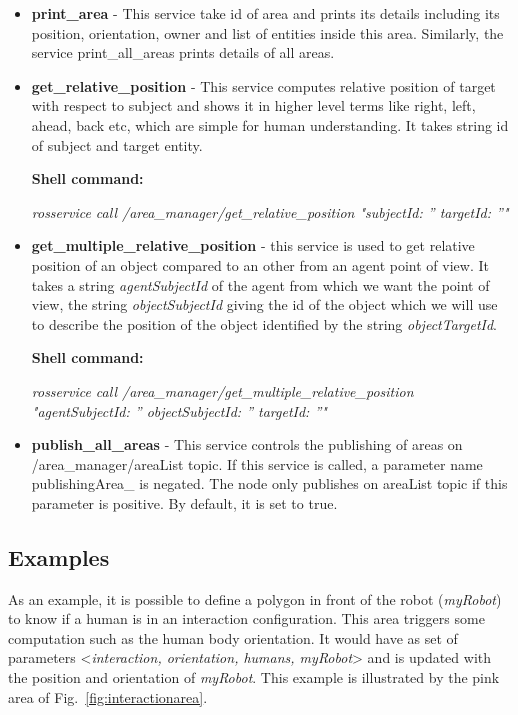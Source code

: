\documentclass[a4paper]{article}
\begin{document}
\begin{itemize}
\item \textbf{print\_area} - This service take id of area and prints its details including its position, orientation, owner and list of entities inside this area. Similarly, the service print\_all\_areas prints details of all areas.

\item \textbf{get\_relative\_position} - This service computes relative position of target with respect to subject and shows it in higher level terms like right, left, ahead, back etc, which are simple for human understanding. It takes string id of subject and target entity.

\textbf{Shell command:}

\textit{rosservice call /area\_manager/get\_relative\_position "subjectId: ''
targetId: ''" }

\item \textbf{get\_multiple\_relative\_position} - this service is used to get relative position of an object compared to an other from an agent point of view. It takes a string \textit{agentSubjectId} of the agent from which we want the point of view, the string \textit{objectSubjectId} giving the id of the object which we will use to describe the position of the object identified by the string \textit{objectTargetId}.

\textbf{Shell command:}

\textit{rosservice call /area\_manager/get\_multiple\_relative\_position "agentSubjectId: ''
objectSubjectId: ''
targetId: ''"}

\item \textbf{publish\_all\_areas }- This service controls the publishing of areas on /area\_manager/areaList topic. If this service is called, a parameter name publishingArea\_ is negated. The node only publishes on areaList topic if this parameter is positive. By default, it is set to true.
\end{itemize}

\subsection{Examples}
As an example, it is possible to define a polygon in front of the robot (\textit{myRobot}) to know if a human is in an interaction configuration. This area triggers some computation such as the human body orientation. It would have as set of parameters <\textit{interaction, orientation, humans, myRobot}> and is updated with the position and orientation of \textit{myRobot}. This example is illustrated by the pink area of Fig.~\ref{fig:interactionarea}.
\end{document}
